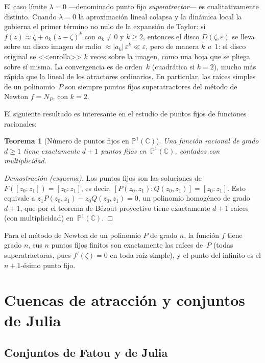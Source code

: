 \documentclass[11pt,a4paper]{article}
\theoremstyle{plain}
\newtheorem{teorema}{Teorema}[section]
\theoremstyle{definition}
\theoremstyle{remark}
\newcommand{\Puno}{\mathbb{P}^1(\mathbb{C})}
\begin{document}
El caso límite $\lambda=0$ —denominado punto fijo \emph{superatractor}— es cualitativamente distinto.
Cuando $\lambda=0$ la aproximación lineal colapsa y la dinámica local
la gobierna el primer término no nulo de la expansión de Taylor:
si $f(z)\approx\zeta+a_k(z-\zeta)^k$ con $a_k\neq 0$ y $k\geq 2$,
entonces el disco $D(\zeta,\varepsilon)$ se lleva sobre un disco imagen de
radio $\approx|a_k|\,\varepsilon^k\ll\varepsilon$, pero de manera \emph{$k$ a~$1$}:
el disco original se <<enrolla>> $k$ veces sobre la imagen,
como una hoja que se pliega sobre sí misma.
La convergencia es de orden~$k$ (cuadrática si $k=2$), mucho más rápida
que la lineal de los atractores ordinarios.
En particular, las raíces simples de un polinomio~$P$ son siempre puntos
fijos superatractores del método de Newton $f=N_P$, con $k=2$.



El siguiente resultado es interesante en el estudio de puntos fijos de funciones racionales:

\begin{teorema}[Número  de puntos fijos en $\Puno$]
\label{teo:puntosfijos}
Una función racional de grado $d\geq 1$ tiene exactamente $d+1$
puntos fijos en~$\Puno$, contados con multiplicidad.
\end{teorema}

\begin{proof}[Demostración (esquema)]
Los puntos fijos son las soluciones de $F([z_0:z_1])=[z_0:z_1]$,
es decir, $[P(z_0,z_1):Q(z_0,z_1)]=[z_0:z_1]$.
Esto equivale a $z_1 P(z_0,z_1)-z_0 Q(z_0,z_1)=0$, un polinomio
homogéneo de grado $d+1$, que por el teorema de Bézout proyectivo
tiene exactamente $d+1$ raíces (con multiplicidad) en~$\Puno$.
\end{proof}

Para el método de Newton de un polinomio $P$ de grado $n$, la función
$f$ tiene grado $n$, sus $n$ puntos fijos finitos son exactamente
las raíces de~$P$ (todas superatractoras, pues $f'(\zeta)=0$ en toda
raíz simple), y el punto del infinito es el $n+1$-ésimo punto fijo.

\section{Cuencas de atracción y conjuntos de Julia}
\label{sec:cuencas}

\subsection{Conjuntos de Fatou y de Julia}
\label{ssec:julia}
\end{document}

